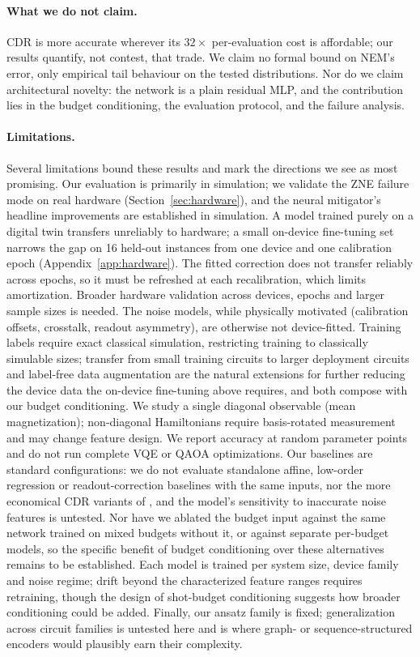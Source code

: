 \documentclass[11pt]{article}
\begin{document}
\paragraph{What we do not claim.}
CDR is more accurate wherever its $32\times$ per-evaluation cost is affordable; our results quantify, not contest, that trade. We claim no formal bound on NEM's error, only empirical tail behaviour on the tested distributions. Nor do we claim architectural novelty: the network is a plain residual MLP, and the contribution lies in the budget conditioning, the evaluation protocol, and the failure analysis.

\paragraph{Limitations.}
Several limitations bound these results and mark the directions we see as most promising. Our evaluation is primarily in simulation; we validate the ZNE failure mode on real hardware (Section~\ref{sec:hardware}), and the neural mitigator's headline improvements are established in simulation. A model trained purely on a digital twin transfers unreliably to hardware; a small on-device fine-tuning set narrows the gap on 16 held-out instances from one device and one calibration epoch (Appendix~\ref{app:hardware}). The fitted correction does not transfer reliably across epochs, so it must be refreshed at each recalibration, which limits amortization. Broader hardware validation across devices, epochs and larger sample sizes is needed. The noise models, while physically motivated (calibration offsets, crosstalk, readout asymmetry), are otherwise not device-fitted. Training labels require exact classical simulation, restricting training to classically simulable sizes; transfer from small training circuits to larger deployment circuits \citep{cantori2024synergy,strikis2021learning} and label-free data augmentation \citep{liao2025noiseagnostic} are the natural extensions for further reducing the device data the on-device fine-tuning above requires, and both compose with our budget conditioning. We study a single diagonal observable (mean magnetization); non-diagonal Hamiltonians require basis-rotated measurement and may change feature design. We report accuracy at random parameter points and do not run complete VQE or QAOA optimizations. Our baselines are standard configurations: we do not evaluate standalone affine, low-order regression or readout-correction baselines with the same inputs, nor the more economical CDR variants of \citet{czarnik2025improving}, and the model's sensitivity to inaccurate noise features is untested. Nor have we ablated the budget input against the same network trained on mixed budgets without it, or against separate per-budget models, so the specific benefit of budget conditioning over these alternatives remains to be established. Each model is trained per system size, device family and noise regime; drift beyond the characterized feature ranges requires retraining, though the design of shot-budget conditioning suggests how broader conditioning could be added. Finally, our ansatz family is fixed; generalization across circuit families is untested here and is where graph- or sequence-structured encoders would plausibly earn their complexity.
\end{document}
